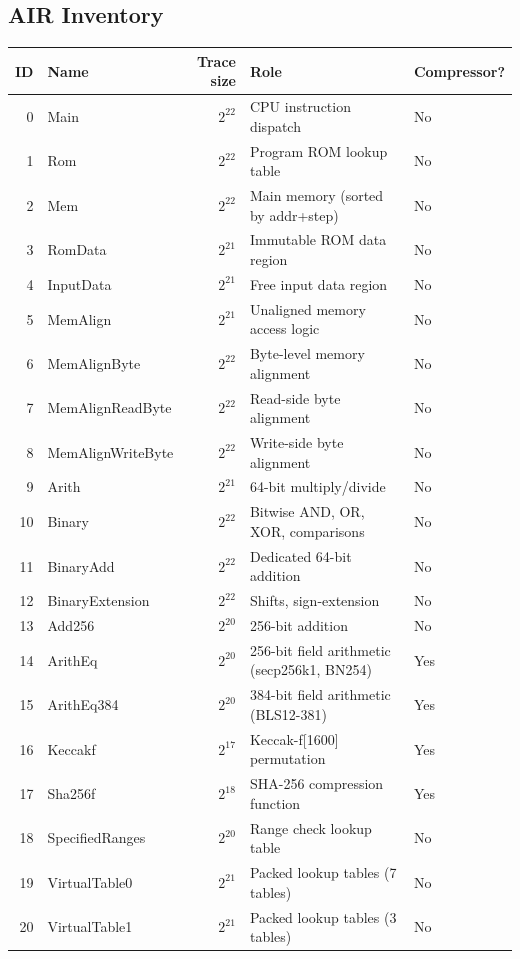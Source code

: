 \subsection{AIR Inventory}
\label{sec:air-inventory}

\begin{center}
\renewcommand{\arraystretch}{1.3}
\begin{tabular}{@{}rlrll@{}}
  \toprule
  ID & Name & Trace size & Role & Compressor? \\
  \midrule
  0  & Main              & $2^{22}$ & CPU instruction dispatch        & No \\
  1  & Rom               & $2^{22}$ & Program ROM lookup table        & No \\
  2  & Mem               & $2^{22}$ & Main memory (sorted by addr+step) & No \\
  3  & RomData           & $2^{21}$ & Immutable ROM data region       & No \\
  4  & InputData         & $2^{21}$ & Free input data region          & No \\
  5  & MemAlign          & $2^{21}$ & Unaligned memory access logic   & No \\
  6  & MemAlignByte      & $2^{22}$ & Byte-level memory alignment     & No \\
  7  & MemAlignReadByte  & $2^{22}$ & Read-side byte alignment        & No \\
  8  & MemAlignWriteByte & $2^{22}$ & Write-side byte alignment       & No \\
  9  & Arith             & $2^{21}$ & 64-bit multiply/divide          & No \\
  10 & Binary            & $2^{22}$ & Bitwise AND, OR, XOR, comparisons & No \\
  11 & BinaryAdd         & $2^{22}$ & Dedicated 64-bit addition       & No \\
  12 & BinaryExtension   & $2^{22}$ & Shifts, sign-extension          & No \\
  13 & Add256            & $2^{20}$ & 256-bit addition                & No \\
  14 & ArithEq           & $2^{20}$ & 256-bit field arithmetic (secp256k1, BN254) & Yes \\
  15 & ArithEq384        & $2^{20}$ & 384-bit field arithmetic (BLS12-381) & Yes \\
  16 & Keccakf           & $2^{17}$ & Keccak-f[1600] permutation      & Yes \\
  17 & Sha256f           & $2^{18}$ & SHA-256 compression function    & Yes \\
  18 & SpecifiedRanges   & $2^{20}$ & Range check lookup table        & No \\
  19 & VirtualTable0     & $2^{21}$ & Packed lookup tables (7 tables) & No \\
  20 & VirtualTable1     & $2^{21}$ & Packed lookup tables (3 tables) & No \\
  \bottomrule
\end{tabular}
\end{center}

